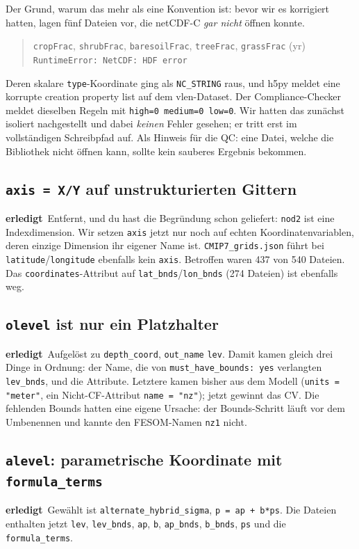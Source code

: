 \documentclass[11pt,a4paper]{article}
\newcommand{\code}[1]{\texttt{\small #1}}
\newcommand{\ok}{\textcolor{green!45!black}{\textbf{erledigt}}}
\begin{document}
Der Grund, warum das mehr als eine Konvention ist: bevor wir es korrigiert hatten,
lagen f\"unf Dateien vor, die netCDF-C \emph{gar nicht} \"offnen konnte.

\begin{quote}
\code{cropFrac}, \code{shrubFrac}, \code{baresoilFrac}, \code{treeFrac},
\code{grassFrac} (yr) \\
\code{RuntimeError: NetCDF: HDF error}
\end{quote}

Deren skalare \code{type}-Koordinate ging als \code{NC\_STRING} raus, und h5py meldet
eine korrupte creation property list auf dem vlen-Dataset. Der Compliance-Checker
meldet dieselben Regeln mit \code{high=0 medium=0 low=0}. Wir hatten das zun\"achst
isoliert nachgestellt und dabei \emph{keinen} Fehler gesehen; er tritt erst im
vollst\"andigen Schreibpfad auf. Als Hinweis f\"ur die QC: eine Datei, welche die
Bibliothek nicht \"offnen kann, sollte kein sauberes Ergebnis bekommen.

\subsection*{\code{axis = X/Y} auf unstrukturierten Gittern}
\ok\ Entfernt, und du hast die Begr\"undung schon geliefert: \code{nod2} ist eine
Indexdimension. Wir setzen \code{axis} jetzt nur noch auf echten
Koordinatenvariablen, deren einzige Dimension ihr eigener Name ist.
\code{CMIP7\_grids.json} f\"uhrt bei \code{latitude}/\code{longitude} ebenfalls kein
\code{axis}. Betroffen waren 437 von 540 Dateien. Das \code{coordinates}-Attribut auf
\code{lat\_bnds}/\code{lon\_bnds} (274 Dateien) ist ebenfalls weg.

\subsection*{\code{olevel} ist nur ein Platzhalter}
\ok\ Aufgel\"ost zu \code{depth\_coord}, \code{out\_name} \code{lev}. Damit kamen
gleich drei Dinge in Ordnung: der Name, die von \code{must\_have\_bounds: yes}
verlangten \code{lev\_bnds}, und die Attribute. Letztere kamen bisher aus dem Modell
(\code{units = "meter"}, ein Nicht-CF-Attribut \code{name = "nz"}); jetzt gewinnt das
CV. Die fehlenden Bounds hatten eine eigene Ursache: der Bounds-Schritt l\"auft vor
dem Umbenennen und kannte den FESOM-Namen \code{nz1} nicht.

\subsection*{\code{alevel}: parametrische Koordinate mit \code{formula\_terms}}
\ok\ Gew\"ahlt ist \code{alternate\_hybrid\_sigma}, \code{p = ap + b*ps}. Die Dateien
enthalten jetzt \code{lev}, \code{lev\_bnds}, \code{ap}, \code{b}, \code{ap\_bnds},
\code{b\_bnds}, \code{ps} und die \code{formula\_terms}.
\end{document}
